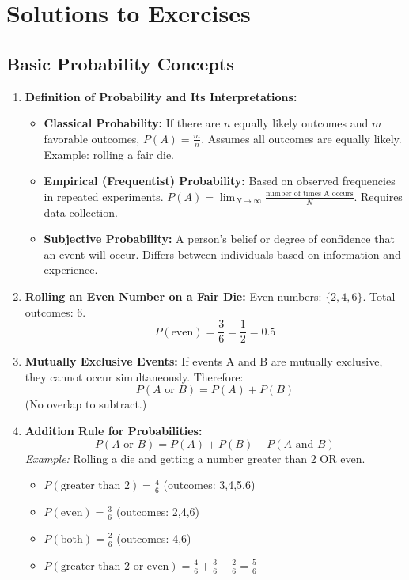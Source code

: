 \section{Solutions to Exercises}

\subsection{Basic Probability Concepts}

\begin{enumerate}
    \item \textbf{Definition of Probability and Its Interpretations:}
    \begin{itemize}
        \item \textbf{Classical Probability:} If there are $n$ equally likely outcomes and $m$ favorable outcomes, $P(A) = \frac{m}{n}$. Assumes all outcomes are equally likely. Example: rolling a fair die.
        \item \textbf{Empirical (Frequentist) Probability:} Based on observed frequencies in repeated experiments. $P(A) = \lim_{N \to \infty} \frac{\text{number of times A occurs}}{N}$. Requires data collection.
        \item \textbf{Subjective Probability:} A person's belief or degree of confidence that an event will occur. Differs between individuals based on information and experience.
    \end{itemize}
    
    \item \textbf{Rolling an Even Number on a Fair Die:}
    Even numbers: $\{2, 4, 6\}$. Total outcomes: 6.
    \begin{equation}
        P(\text{even}) = \frac{3}{6} = \frac{1}{2} = 0.5
    \end{equation}
    
    \item \textbf{Mutually Exclusive Events:}
    If events A and B are mutually exclusive, they cannot occur simultaneously. Therefore:
    \begin{equation}
        P(A \text{ or } B) = P(A) + P(B)
    \end{equation}
    (No overlap to subtract.)
    
    \item \textbf{Addition Rule for Probabilities:}
    \begin{equation}
        P(A \text{ or } B) = P(A) + P(B) - P(A \text{ and } B)
    \end{equation}
    \textit{Example:} Rolling a die and getting a number greater than 2 OR even.
    \begin{itemize}
        \item $P(\text{greater than 2}) = \frac{4}{6}$ (outcomes: 3,4,5,6)
        \item $P(\text{even}) = \frac{3}{6}$ (outcomes: 2,4,6)
        \item $P(\text{both}) = \frac{2}{6}$ (outcomes: 4,6)
        \item $P(\text{greater than 2 or even}) = \frac{4}{6} + \frac{3}{6} - \frac{2}{6} = \frac{5}{6}$
    \end{itemize}
    

\end{enumerate}

